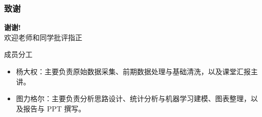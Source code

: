 \documentclass[aspectratio=169]{ctexbeamer}
\begin{document}
\begin{frame}
  \frametitle{致谢}
  \begin{center}
    {\Huge\bfseries 谢谢!}\\[0.22cm]
    {\large 欢迎老师和同学批评指正}
  \end{center}
  \vspace{0.35cm}
  \begin{block}{成员分工}
    \begin{itemize}
      \item 杨大权：主要负责原始数据采集、前期数据处理与基础清洗，以及课堂汇报主讲。
      \item 图力格尔：主要负责分析思路设计、统计分析与机器学习建模、图表整理，以及报告与 PPT 撰写。
    \end{itemize}
  \end{block}
\end{frame}
\end{document}
